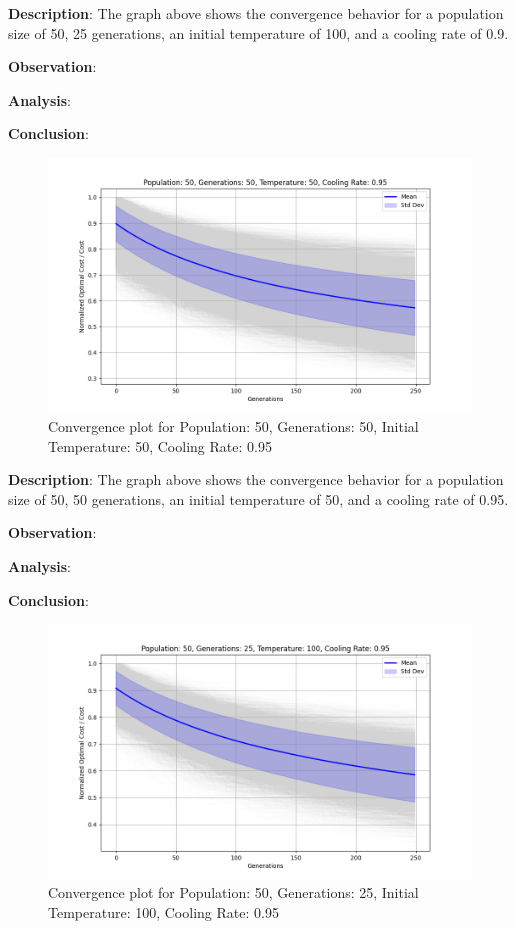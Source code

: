 \documentclass[
]{article}
\begin{document}
\textbf{Description}: The graph above shows the convergence behavior for a population size of 50, 25 generations, an initial temperature of 100, and a cooling rate of 0.9.

\textbf{Observation}:

\textbf{Analysis}:

\textbf{Conclusion}:

\begin{figure}[H]
    \centering
    \includegraphics[width=\textwidth]{genetic_simulated_annealing_hybrid/Population_50_Generations_50_Temperature_50_CoolingRate_0.95}
    \caption{Convergence plot for Population: 50, Generations: 50, Initial Temperature: 50, Cooling Rate: 0.95}
    \label{fig:ga_sa_50_50_50_095}
\end{figure}

\textbf{Description}: The graph above shows the convergence behavior for a population size of 50, 50 generations, an initial temperature of 50, and a cooling rate of 0.95.

\textbf{Observation}:

\textbf{Analysis}:

\textbf{Conclusion}:

\begin{figure}[H]
    \centering
    \includegraphics[width=\textwidth]{genetic_simulated_annealing_hybrid/Population_50_Generations_25_Temperature_100_CoolingRate_0.95}
    \caption{Convergence plot for Population: 50, Generations: 25, Initial Temperature: 100, Cooling Rate: 0.95}
    \label{fig:ga_sa_50_25_100_095}
\end{figure}
\end{document}
